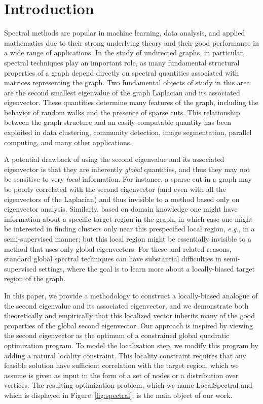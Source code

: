 \documentclass[11pt]{article}
\begin{document}
\section{Introduction}
\label{sxn:intro}

Spectral methods are popular in machine learning, data analysis, and applied 
mathematics due to  their strong underlying theory and their good 
performance in a wide range of applications.
In the study of undirected graphs, in particular, spectral techniques play 
an important role, as many fundamental structural properties of a graph 
depend directly on spectral quantities associated with matrices representing 
the graph.
Two fundamental objects of study in this area are the second smallest 
eigenvalue of the graph Laplacian and its associated eigenvector.
These quantities determine many features of the graph, including the 
behavior of random walks and the presence of sparse cuts.
This relationship between the graph structure and an easily-computable 
quantity has been exploited in data clustering, community detection, image 
segmentation, parallel computing, and many other applications.

A potential drawback of using the second eigenvalue and its associated 
eigenvector is that they are inherently \emph{global} quantities, and thus 
they may not be sensitive to very \emph{local} information. 
For instance, a sparse cut in a graph may be poorly correlated with the 
second eigenvector (and even with all the eigenvectors of the Laplacian) 
and thus invisible to a method based only on eigenvector analysis. 
Similarly, based on domain knowledge one might have information about a 
specific target region in the graph, in which case one might be interested 
in finding clusters only near this prespecified local region, \emph{e.g.}, 
in a semi-supervised manner; but this local region might be essentially 
invisible to a method that uses only global eigenvectors.
For these and related reasons, standard global spectral techniques can have 
substantial difficulties in semi-supervised settings, where the goal is to 
learn more about a locally-biased target region of the graph.

In this paper, we provide a methodology to construct a locally-biased 
analogue of the second eigenvalue and its associated eigenvector, and we 
demonstrate both theoretically and empirically that this localized vector 
inherits many of the good properties of the global second eigenvector. 
Our approach is inspired by viewing the second eigenvector as the optimum of 
a constrained global quadratic optimization program. 
To model the localization step, we modify this program by adding a natural 
locality constraint.
This locality constraint requires that any feasible solution have sufficient 
correlation with the target region, which we assume is given as input in 
the form of a set of nodes or a distribution over vertices. 
The resulting optimization problem, which we name \textsf{LocalSpectral} and 
which is displayed in Figure~\ref{fig:spectral},
is the main object of our work. 
\end{document}
